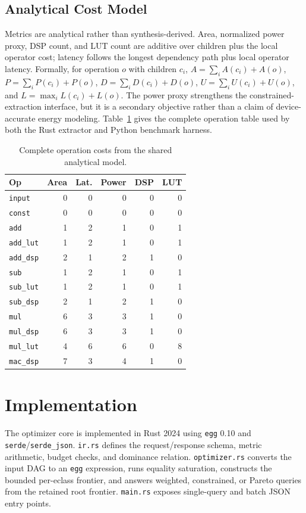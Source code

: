\documentclass[sigplan,10pt,review]{acmart}
\begin{document}
\subsection{Analytical Cost Model}
Metrics are analytical rather than synthesis-derived. Area, normalized power proxy, DSP count, and LUT count are additive over children plus the local operator cost; latency follows the longest dependency path plus local operator latency. Formally, for operation $o$ with children $c_i$, $A=\sum_i A(c_i)+A(o)$, $P=\sum_i P(c_i)+P(o)$, $D=\sum_i D(c_i)+D(o)$, $U=\sum_i U(c_i)+U(o)$, and $L=\max_i L(c_i)+L(o)$. The power proxy strengthens the constrained-extraction interface, but it is a secondary objective rather than a claim of device-accurate energy modeling. Table~\ref{tab:cost-model} gives the complete operation table used by both the Rust extractor and Python benchmark harness.

\begin{table}[t]
\caption{Complete operation costs from the shared analytical model.}
\label{tab:cost-model}
\centering
\footnotesize
\setlength{\tabcolsep}{3pt}
\begin{tabular}{lrrrrr}
\toprule
Op & Area & Lat. & Power & DSP & LUT \\
\midrule
\texttt{input} & 0 & 0 & 0 & 0 & 0 \\
\texttt{const} & 0 & 0 & 0 & 0 & 0 \\
\texttt{add} & 1 & 2 & 1 & 0 & 1 \\
\texttt{add\_lut} & 1 & 2 & 1 & 0 & 1 \\
\texttt{add\_dsp} & 2 & 1 & 2 & 1 & 0 \\
\texttt{sub} & 1 & 2 & 1 & 0 & 1 \\
\texttt{sub\_lut} & 1 & 2 & 1 & 0 & 1 \\
\texttt{sub\_dsp} & 2 & 1 & 2 & 1 & 0 \\
\texttt{mul} & 6 & 3 & 3 & 1 & 0 \\
\texttt{mul\_dsp} & 6 & 3 & 3 & 1 & 0 \\
\texttt{mul\_lut} & 4 & 6 & 6 & 0 & 8 \\
\texttt{mac\_dsp} & 7 & 3 & 4 & 1 & 0 \\
\bottomrule
\end{tabular}
\end{table}

\section{Implementation}
The optimizer core is implemented in Rust 2024 using \texttt{egg} 0.10 and \texttt{serde}/\texttt{serde\_json}. \texttt{ir.rs} defines the request/response schema, metric arithmetic, budget checks, and dominance relation. \texttt{optimizer.rs} converts the input DAG to an \texttt{egg} expression, runs equality saturation, constructs the bounded per-eclass frontier, and answers weighted, constrained, or Pareto queries from the retained root frontier. \texttt{main.rs} exposes single-query and batch JSON entry points.
\end{document}
